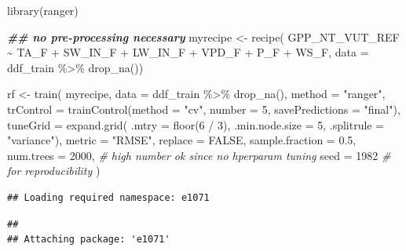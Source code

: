 \documentclass[
]{book}
\newenvironment{Shaded}{\begin{snugshade}}{\end{snugshade}}
\newcommand{\AttributeTok}[1]{\textcolor[rgb]{0.77,0.63,0.00}{#1}}
\newcommand{\CommentTok}[1]{\textcolor[rgb]{0.56,0.35,0.01}{\textit{#1}}}
\newcommand{\ConstantTok}[1]{\textcolor[rgb]{0.00,0.00,0.00}{#1}}
\newcommand{\DecValTok}[1]{\textcolor[rgb]{0.00,0.00,0.81}{#1}}
\newcommand{\DocumentationTok}[1]{\textcolor[rgb]{0.56,0.35,0.01}{\textbf{\textit{#1}}}}
\newcommand{\FloatTok}[1]{\textcolor[rgb]{0.00,0.00,0.81}{#1}}
\newcommand{\FunctionTok}[1]{\textcolor[rgb]{0.00,0.00,0.00}{#1}}
\newcommand{\NormalTok}[1]{#1}
\newcommand{\OtherTok}[1]{\textcolor[rgb]{0.56,0.35,0.01}{#1}}
\newcommand{\SpecialCharTok}[1]{\textcolor[rgb]{0.00,0.00,0.00}{#1}}
\newcommand{\StringTok}[1]{\textcolor[rgb]{0.31,0.60,0.02}{#1}}
\begin{document}
\begin{Shaded}
\begin{Highlighting}[]
\FunctionTok{library}\NormalTok{(ranger)}

\DocumentationTok{\#\# no pre{-}processing necessary}
\NormalTok{myrecipe }\OtherTok{\textless{}{-}} \FunctionTok{recipe}\NormalTok{(}
\NormalTok{  GPP\_NT\_VUT\_REF }\SpecialCharTok{\textasciitilde{}}\NormalTok{ TA\_F }\SpecialCharTok{+}\NormalTok{ SW\_IN\_F }\SpecialCharTok{+}\NormalTok{ LW\_IN\_F }\SpecialCharTok{+}\NormalTok{ VPD\_F }\SpecialCharTok{+}\NormalTok{ P\_F }\SpecialCharTok{+}\NormalTok{ WS\_F, }
  \AttributeTok{data =}\NormalTok{ ddf\_train }\SpecialCharTok{\%\textgreater{}\%} 
    \FunctionTok{drop\_na}\NormalTok{())}

\NormalTok{rf }\OtherTok{\textless{}{-}} \FunctionTok{train}\NormalTok{(}
\NormalTok{  myrecipe, }
  \AttributeTok{data =}\NormalTok{ ddf\_train }\SpecialCharTok{\%\textgreater{}\%} 
    \FunctionTok{drop\_na}\NormalTok{(), }
  \AttributeTok{method =} \StringTok{"ranger"}\NormalTok{,}
  \AttributeTok{trControl =} \FunctionTok{trainControl}\NormalTok{(}\AttributeTok{method =} \StringTok{"cv"}\NormalTok{, }\AttributeTok{number =} \DecValTok{5}\NormalTok{, }\AttributeTok{savePredictions =} \StringTok{"final"}\NormalTok{),}
  \AttributeTok{tuneGrid =} \FunctionTok{expand.grid}\NormalTok{( }\AttributeTok{.mtry =} \FunctionTok{floor}\NormalTok{(}\DecValTok{6} \SpecialCharTok{/} \DecValTok{3}\NormalTok{),}
                          \AttributeTok{.min.node.size =} \DecValTok{5}\NormalTok{,}
                          \AttributeTok{.splitrule =} \StringTok{"variance"}\NormalTok{),}
  \AttributeTok{metric =} \StringTok{"RMSE"}\NormalTok{,}
  \AttributeTok{replace =} \ConstantTok{FALSE}\NormalTok{,}
  \AttributeTok{sample.fraction =} \FloatTok{0.5}\NormalTok{,}
  \AttributeTok{num.trees =} \DecValTok{2000}\NormalTok{,          }\CommentTok{\# high number ok since no hperparam tuning}
  \AttributeTok{seed =} \DecValTok{1982}                \CommentTok{\# for reproducibility}
\NormalTok{)}
\end{Highlighting}
\end{Shaded}

\begin{verbatim}
## Loading required namespace: e1071
\end{verbatim}

\begin{verbatim}
## 
## Attaching package: 'e1071'
\end{verbatim}
\end{document}
